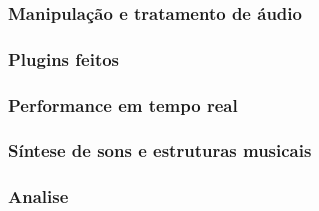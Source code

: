   \subsubsection{Manipulação e tratamento de áudio}
  \label{sec:manip-audio}


  \subsubsection{Plugins feitos}
  \label{sec:tutoriais}

  \subsubsection{Performance em tempo real}
  \label{sec:perf}
  
  \subsubsection{Síntese de sons e estruturas musicais}
  \label{sec:sintese}

  \subsubsection{Analise}
  \label{sec:analise}